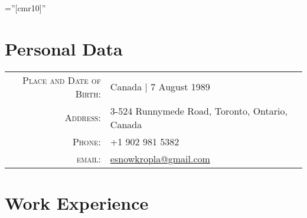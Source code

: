 \documentclass[a4paper,12pt]{article} %
\begin{document}
\pagestyle{empty} %

\font\fb=''[cmr10]'' %


\par{\bigskip\par} %

\section{Personal Data}

\begin{tabular}{rl}
\textsc{Place and Date of Birth:} & Canada  | 7 August 1989 \\
\textsc{Address:} & 3-524 Runnymede Road, Toronto, Ontario, Canada \\
\textsc{Phone:} & +1 902 981 5382\\
\textsc{email:} & \href{mailto:esnowkropla@gmail.com}{esnowkropla@gmail.com}
\end{tabular}


\section{Work Experience}
\end{document}
